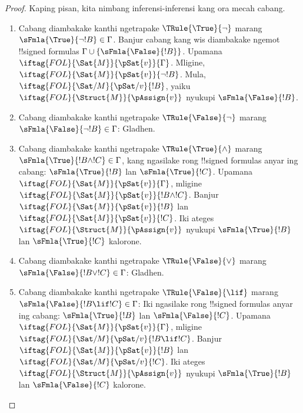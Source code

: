 \documentclass[../../../include/open-logic-section]{subfiles}
\begin{document}
\begin{proof}
Kaping pisan, kita nimbang inferensi-inferensi kang ora mecah cabang.
\begin{enumerate}
\item Cabang diambakake kanthi ngetrapake $\TRule{\True}{\lnot}$
  marang $\sFmla{\True}{\lnot !B} \in \Gamma$. Banjur cabang kang wis
  diambakake ngemot !!{signed formula}s $\Gamma \cup
  \{\sFmla{\False}{!B}\}$. Upamana
  $\iftag{FOL}{\Sat{M}}{\pSat{v}}{\Gamma}$. Mligine,
  $\iftag{FOL}{\Sat{M}}{\pSat{v}}{\lnot !B}$. Mula,
  $\iftag{FOL}{\Sat/{M}}{\pSat/{v}}{!B}$, yaiku
  $\iftag{FOL}{\Struct{M}}{\pAssign{v}}$ nyukupi
  $\sFmla{\False}{!B}$.
\item Cabang diambakake kanthi ngetrapake $\TRule{\False}{\lnot}$
  marang $\sFmla{\False}{\lnot !B} \in \Gamma$: Gladhen.
\item Cabang diambakake kanthi ngetrapake $\TRule{\True}{\land}$
  marang $\sFmla{\True}{!B \land !C} \in \Gamma$, kang ngasilake
  rong !!{signed formula}s anyar ing cabang: $\sFmla{\True}{!B}$ lan
  $\sFmla{\True}{!C}$. Upamana
  $\iftag{FOL}{\Sat{M}}{\pSat{v}}{\Gamma}$, mligine
  $\iftag{FOL}{\Sat{M}}{\pSat{v}}{!B \land !C}$. Banjur
  $\iftag{FOL}{\Sat{M}}{\pSat{v}}{!B}$ lan
  $\iftag{FOL}{\Sat{M}}{\pSat{v}}{!C}$. Iki ateges
  $\iftag{FOL}{\Struct{M}}{\pAssign{v}}$ nyukupi
  $\sFmla{\True}{!B}$ lan $\sFmla{\True}{!C}$ kalorone.
\item Cabang diambakake kanthi ngetrapake $\TRule{\False}{\lor}$
  marang $\sFmla{\False}{!B \lor !C} \in \Gamma$: Gladhen.
\item Cabang diambakake kanthi ngetrapake $\TRule{\False}{\lif}$
  marang $\sFmla{\False}{!B \lif !C} \in \Gamma$: Iki ngasilake
  rong !!{signed formula}s anyar ing cabang: $\sFmla{\True}{!B}$ lan
  $\sFmla{\False}{!C}$. Upamana
  $\iftag{FOL}{\Sat{M}}{\pSat{v}}{\Gamma}$, mligine
  $\iftag{FOL}{\Sat/{M}}{\pSat/{v}}{!B \lif !C}$. Banjur
  $\iftag{FOL}{\Sat{M}}{\pSat{v}}{!B}$ lan
  $\iftag{FOL}{\Sat/{M}}{\pSat/{v}}{!C}$. Iki ateges
  $\iftag{FOL}{\Struct{M}}{\pAssign{v}}$ nyukupi
  $\sFmla{\True}{!B}$ lan $\sFmla{\False}{!C}$ kalorone.

\end{enumerate}
\end{proof}
\end{document}
